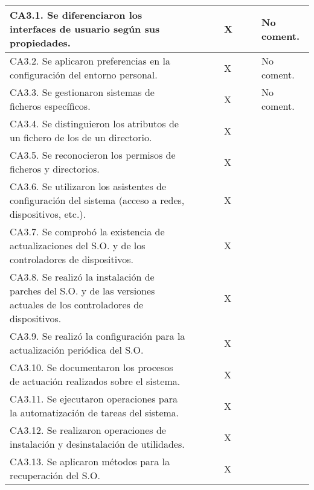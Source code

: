 \documentclass[a4paper,oneside,titlepage,12pt]{article}
\begin{document}
\begin{tabularx}{\textwidth}{| X | M{0.5cm} | M{0.5cm} | M{0.5cm} | M{0.5cm} | M{0.5cm} | M{0.5cm} | m{5cm} |}
    \quad CA3.1. Se diferenciaron los interfaces de usuario según sus propiedades. &  &  &  & X &  &  & No coment. \\\hline
    
    \quad CA3.2. Se aplicaron preferencias en la configuración del entorno personal. &  &  &  & X &  &  & No coment. \\\hline
    
    \quad CA3.3. Se gestionaron sistemas de ficheros específicos. &  &  &  & X &  &  & No coment. \\\hline
    
    \quad CA3.4. Se distinguieron los atributos de un fichero de los de un directorio. &  &  &  & X &  &  & \\\hline
    
    \quad CA3.5. Se reconocieron los permisos de ficheros y directorios. &  &  &  & X &  &  & \\\hline
    
    \quad CA3.6. Se utilizaron los asistentes de configuración del sistema (acceso a redes, dispositivos, etc.). &  &  &  & X &  &  & \\\hline
    
    \quad CA3.7. Se comprobó la existencia de actualizaciones del S.O. y de los controladores de dispositivos. &  &  &  & X &  &  & \\\hline
    
    \quad CA3.8. Se realizó la instalación de parches del S.O. y de las versiones actuales de los controladores de dispositivos. &  &  &  & X &  &  & \\\hline
    
    \quad CA3.9. Se realizó la configuración para la actualización periódica del S.O. &  &  &  & X &  &  & \\\hline
    
    \quad CA3.10. Se documentaron los procesos de actuación realizados sobre el sistema. &  &  &  & X &  &  & \\\hline
    
    \quad CA3.11. Se ejecutaron operaciones para la automatización de tareas del sistema. &  &  &  & X &  &  & \\\hline
    
    \quad CA3.12. Se realizaron operaciones de instalación y desinstalación de utilidades. &  &  &  & X &  &  & \\\hline
    
    \quad CA3.13. Se aplicaron métodos para la recuperación del S.O. &  &  &  & X &  &  & \\\hline\hline
    

\end{tabularx}
\end{document}
